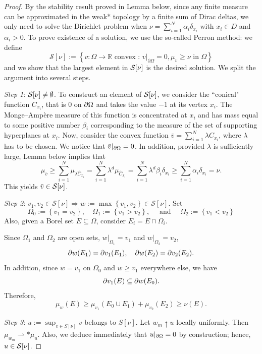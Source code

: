	\begin{proof}
		By the stability result proved in Lemma below, since any finite measure can be approximated in the weak*
		topology by a finite sum of Dirac deltas, we only need to
		solve the Dirichlet problem  when $\nu=\sum_{i=1}^N \alpha_i \delta_{x_i}$ with $x_i\in D$ and $\alpha_i>0$. To prove existence of a solution, we use the so-called Perron method: we define 
		$$
		\mathcal{S}[\nu]:=\left\{v: \Omega \rightarrow \mathbb{R} \text { convex : }\left.v\right|_{\partial \Omega}=0, \mu_v \geq \nu \text { in } \Omega\right\}
		$$
		and we show that the largest element in ${\mathcal S}[\nu]$ is the desired solution. We split the argument into several steps.
		
		{\em Step 1}: ${\mathcal S}[\nu]\neq \emptyset$. To construct an element of ${\mathcal S}[\nu]$, we consider the ``conical" function $C_{x_i}$, that is $0$ on $\partial\Omega$ and takes the value $-1$ at its vertex $x_i$. The Monge–Ampère measure of this function is concentrated at $x_i$ and has mass equal
		to some positive number $\beta_i$ corresponding to the measure of the set of supporting hyperplanes at $x_i$. Now, consider the convex function $\bar v=\sum_{i=1}^N \lambda C_{x_i}$, where $\lambda$ has to be chosen.
		We notice that $\bar v|_{\partial \Omega}=0$. In addition, provided $\lambda$ is sufficiently large, Lemma below  
		implies that 
		$$
		\mu_{\bar{v}} \geq \sum_{i=1}^N \mu_{\lambda \hat{C}_{x_i}}=\sum_{i=1}^N \lambda^d \mu_{\hat{C}_{x_i}}=\sum_{i=1}^N \lambda^d \beta_i \delta_{x_i} \geq \sum_{i=1}^N \alpha_i \delta_{x_i} = \nu.
		$$
		This yields $\bar v\in {\mathcal S}[\nu]$. 
		
		{\em Step 2}: $v_1, v_2 \in \mathcal{S}[\nu] \Rightarrow w:=\max \left\{v_1, v_2\right\} \in \mathcal{S}[\nu]$. Set 
		$$
		\Omega_0:=\left\{v_1=v_2\right\}, \quad \Omega_1:=\left\{v_1>v_2\right\}, \quad \text { and } \quad \Omega_2:=\left\{v_1<v_2\right\}
		$$
		Also, given a Borel set $E\subseteq \Omega$, consider $E_i= E\cap \Omega_i$. 
		
		Since $\Omega_1$ and $\Omega_2$ are open sets, $w|_{\Omega_1}=v_1$ and $w|_{\Omega_2}=v_2$, 
		$$
		\partial w(E_1) = \partial v_1(E_1), \quad   \partial w(E_2) = \partial v_2(E_2). 
		$$
		In addition, since $w=v_1$ on $\Omega_0$ and $w\geq v_1$ everywhere else, we have 
		$$
		\partial v_1(E) \subseteq \partial w(E_0). 
		$$
		Therefore, 
		$$
		\mu_w (E) \geq \mu_{v_1}(E_0\cup E_1)+ \mu_{v_2} (E_2) \geq \nu(E).  
		$$
		
		{\em Step 3}: $u:=\sup _{v \in S[\nu]} v$  belongs to  $S[\nu]$. Let $w_m \uparrow u$ locally uniformly. Then $\mu_{w_m} \rightharpoonup*\mu_u$.  Also, we deduce
		immediately that $u|_{\partial\Omega}=0$ by construction;  hence, $u\in {\mathcal S}[\nu]$. 
		

\end{proof}
